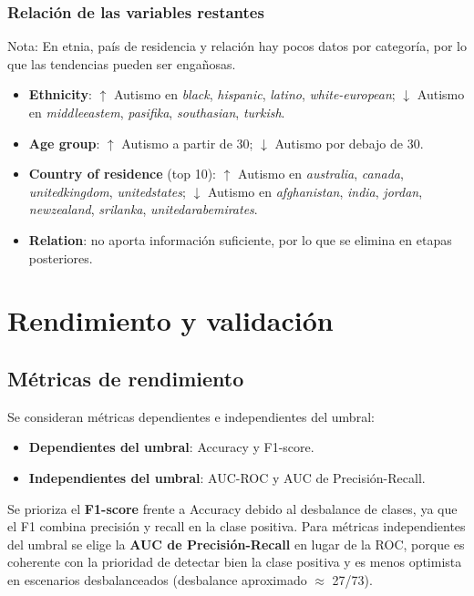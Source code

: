 \documentclass[12pt]{article}
\begin{document}
\subsubsection*{Relación de las variables restantes}
Nota: En etnia, país de residencia y relación hay pocos datos por categoría,
por lo que las tendencias pueden ser engañosas.
\begin{itemize}
    \item \textbf{Ethnicity}: $\uparrow$ Autismo en \emph{black}, \emph{hispanic}, \emph{latino}, \emph{white-european};
    $\downarrow$ Autismo en \emph{middleeastem}, \emph{pasifika}, \emph{southasian}, \emph{turkish}.
    \item \textbf{Age group}: $\uparrow$ Autismo a partir de 30; $\downarrow$ Autismo por debajo de 30.
    \item \textbf{Country of residence} (top 10): $\uparrow$ Autismo en \emph{australia}, \emph{canada},
    \emph{unitedkingdom}, \emph{unitedstates}; $\downarrow$ Autismo en \emph{afghanistan}, \emph{india},
    \emph{jordan}, \emph{newzealand}, \emph{srilanka}, \emph{unitedarabemirates}.
    \item \textbf{Relation}: no aporta información suficiente, por lo que se elimina en etapas posteriores.
\end{itemize}

\section{Rendimiento y validación}
\subsection{Métricas de rendimiento}
Se consideran métricas dependientes e independientes del umbral:
\begin{itemize}
    \item \textbf{Dependientes del umbral}: Accuracy y F1-score.
    \item \textbf{Independientes del umbral}: AUC-ROC y AUC de Precisión-Recall.
\end{itemize}

Se prioriza el \textbf{F1-score} frente a Accuracy debido al desbalance de clases, ya que el F1
combina precisión y recall en la clase positiva. Para métricas independientes del umbral se
elige la \textbf{AUC de Precisión-Recall} en lugar de la ROC, porque es coherente con la
prioridad de detectar bien la clase positiva y es menos optimista en escenarios desbalanceados
(desbalance aproximado $\approx$ 27/73).
\end{document}
